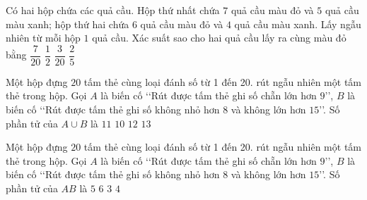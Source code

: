 \begin{ex}%
	Có hai hộp chứa các quả cầu. Hộp thứ nhất  chứa $ 7 $ quả cầu màu đỏ và $ 5 $ quả cầu màu xanh; hộp thứ hai chứa $ 6 $ quả cầu màu đỏ và $ 4 $ quả cầu màu xanh. Lấy ngẫu nhiên từ mỗi hộp $ 1 $ quả cầu. Xác suất sao cho hai quả cầu lấy ra cùng màu đỏ bằng
	\choice
	{\True $ \dfrac{7}{20} $}
	{$ \dfrac{1}{2} $}
	{$ \dfrac{3}{20} $}
	{$ \dfrac{2}{5} $}
\end{ex}
\begin{ex} %
	Một hộp đựng $20$ tấm thẻ cùng loại đánh số từ 1 đến 20. rút ngẫu nhiên một tấm thẻ trong hộp. Gọi $A$ là biến cố \lq\lq  Rút được tấm thẻ ghi số chẵn lớn hơn $9$\rq\rq, $B$ là biến cố \lq\lq  Rút được tấm thẻ ghi số không nhỏ hơn $8$ và không lớn hơn $15$\rq\rq. Số phần tử của $A\cup B$ là 
	\choice
	{\True$11$}
	{$10$}
	{$12$}
	{$13$}
\end{ex}
\begin{ex} %
	Một hộp đựng $20$ tấm thẻ cùng loại đánh số từ 1 đến 20. rút ngẫu nhiên một tấm thẻ trong hộp. Gọi $A$ là biến cố \lq\lq  Rút được tấm thẻ ghi số chẵn lớn hơn $9$\rq\rq, $B$ là biến cố \lq\lq  Rút được tấm thẻ ghi số không nhỏ hơn $8$ và không lớn hơn $15$\rq\rq. Số phần tử của $AB$ là
	\choice
	{$5$}
	{$6$}
	{\True$3$}
	{$4$}
\end{ex}
